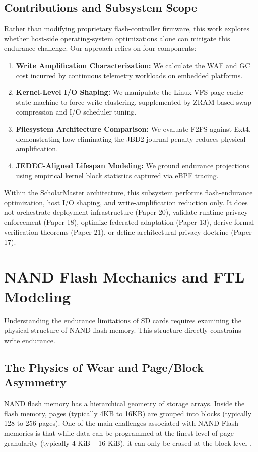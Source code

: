 \documentclass[conference]{IEEEtran}
\begin{document}
\subsection{Contributions and Subsystem Scope}
Rather than modifying proprietary flash-controller firmware, this work explores whether host-side operating-system optimizations alone can mitigate this endurance challenge. Our approach relies on four components:
\begin{enumerate}
    \item \textbf{Write Amplification Characterization:} We calculate the WAF and GC cost incurred by continuous telemetry workloads on embedded platforms.
    \item \textbf{Kernel-Level I/O Shaping:} We manipulate the Linux VFS page-cache state machine to force write-clustering, supplemented by ZRAM-based swap compression and I/O scheduler tuning.
    \item \textbf{Filesystem Architecture Comparison:} We evaluate F2FS against Ext4, demonstrating how eliminating the JBD2 journal penalty reduces physical amplification.
    \item \textbf{JEDEC-Aligned Lifespan Modeling:} We ground endurance projections using empirical kernel block statistics captured via eBPF tracing.
\end{enumerate}

Within the ScholarMaster architecture, this subsystem performs flash-endurance optimization, host I/O shaping, and write-amplification reduction only. It does not orchestrate deployment infrastructure (Paper 20), validate runtime privacy enforcement (Paper 18), optimize federated adaptation (Paper 13), derive formal verification theorems (Paper 21), or define architectural privacy doctrine (Paper 17).

\section{NAND Flash Mechanics and FTL Modeling}

Understanding the endurance limitations of SD cards requires examining the physical structure of NAND flash memory. This structure directly constrains write endurance.

\subsection{The Physics of Wear and Page/Block Asymmetry}
NAND flash memory has a hierarchical geometry of storage arrays. Inside the flash memory, pages (typically 4KB to 16KB) are grouped into blocks (typically 128 to 256 pages). One of the main challenges associated with NAND Flash memories is that while data can be programmed at the finest level of page granularity (typically 4 KiB – 16 KiB), it can only be erased at the block level \cite{b5}. 
\end{document}
